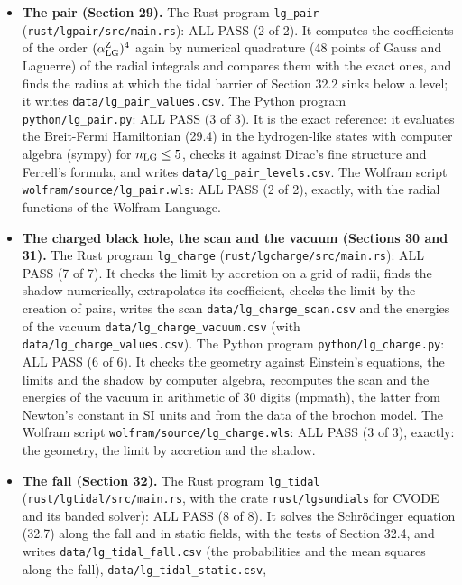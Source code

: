 \documentclass[
  10pt,
]{article}
\providecommand{\tightlist}{%
  \setlength{\itemsep}{0pt}\setlength{\parskip}{0pt}}
\begin{document}
\begin{itemize}
\tightlist
\item
  \textbf{The pair (Section 29).} The Rust program \texttt{lg\_pair}
  (\texttt{rust/lgpair/src/main.rs}): ALL PASS (2 of 2). It computes the
  coefficients of the order \((\alpha^{\rm Z}_{\rm LG})^4\) again by
  numerical quadrature (48 points of Gauss and Laguerre) of the radial
  integrals and compares them with the exact ones, and finds the radius
  at which the tidal barrier of Section 32.2 sinks below a level; it
  writes \texttt{data/lg\_pair\_values.csv}. The Python program
  \texttt{python/lg\_pair.py}: ALL PASS (3 of 3). It is the exact
  reference: it evaluates the Breit-Fermi Hamiltonian (29.4) in the
  hydrogen-like states with computer algebra (sympy) for
  \(n_{\rm LG}\le5\), checks it against Dirac's fine structure and
  Ferrell's formula, and writes \texttt{data/lg\_pair\_levels.csv}. The
  Wolfram script \texttt{wolfram/source/lg\_pair.wls}: ALL PASS (2 of
  2), exactly, with the radial functions of the Wolfram Language.
\item
  \textbf{The charged black hole, the scan and the vacuum (Sections 30
  and 31).} The Rust program \texttt{lg\_charge}
  (\texttt{rust/lgcharge/src/main.rs}): ALL PASS (7 of 7). It checks the
  limit by accretion on a grid of radii, finds the shadow numerically,
  extrapolates its coefficient, checks the limit by the creation of
  pairs, writes the scan \texttt{data/lg\_charge\_scan.csv} and the
  energies of the vacuum \texttt{data/lg\_charge\_vacuum.csv} (with
  \texttt{data/lg\_charge\_values.csv}). The Python program
  \texttt{python/lg\_charge.py}: ALL PASS (6 of 6). It checks the
  geometry against Einstein's equations, the limits and the shadow by
  computer algebra, recomputes the scan and the energies of the vacuum
  in arithmetic of 30 digits (mpmath), the latter from Newton's constant
  in SI units and from the data of the brochon model. The Wolfram script
  \texttt{wolfram/source/lg\_charge.wls}: ALL PASS (3 of 3), exactly:
  the geometry, the limit by accretion and the shadow.
\item
  \textbf{The fall (Section 32).} The Rust program \texttt{lg\_tidal}
  (\texttt{rust/lgtidal/src/main.rs}, with the crate
  \texttt{rust/lgsundials} for CVODE and its banded solver): ALL PASS (8
  of 8). It solves the Schrödinger equation (32.7) along the fall and in
  static fields, with the tests of Section 32.4, and writes
  \texttt{data/lg\_tidal\_fall.csv} (the probabilities and the mean
  squares along the fall), \texttt{data/lg\_tidal\_static.csv},

\end{itemize}
\end{document}
